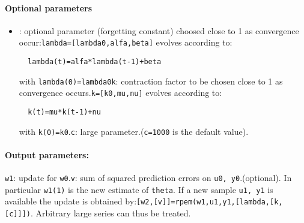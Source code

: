 \paragraph{Optional parameters}
\begin{itemize}
\item {}: optional parameter (forgetting constant) choosed close to 1 as convergence occur:\verb!lambda=[lambda0,alfa,beta]! evolves according to:
\begin{verbatim}
  lambda(t)=alfa*lambda(t-1)+beta 
\end{verbatim}
with \verb!lambda(0)=lambda0!\verb!k!: contraction factor to be chosen close to 1 as convergence occurs.\verb!k=[k0,mu,nu]! evolves according to:
\begin{verbatim}
  k(t)=mu*k(t-1)+nu 
\end{verbatim}
with \verb!k(0)=k0!.\verb!c!: large parameter.(\verb!c=1000! is the default value). 
\end{itemize}
\paragraph{Output parameters:}
\verb!w1!: update for \verb!w0!.\verb!v!: sum of squared prediction errors on \verb!u0, y0!.(optional).
In particular \verb!w1(1)! is the new estimate of \verb!theta!. If a new sample \verb!u1, y1! is available the update is obtained by:\verb![w2,[v]]=rpem(w1,u1,y1,[lambda,[k,[c]]])!. Arbitrary large series can thus be treated.

